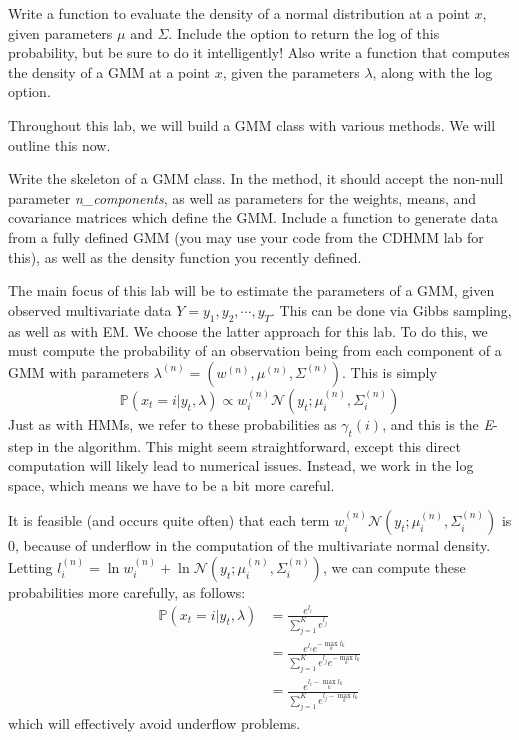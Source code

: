 \begin{problem}
Write a function to evaluate the density of a normal distribution at a point $x$, given parameters $\mu$ and $\Sigma$. Include the option to return the log of this probability, but be sure to do it intelligently! Also write a function that computes the density of a GMM at a point $x$, given the parameters $\lambda$, along with the log option.
\end{problem}

Throughout this lab, we will build a GMM class with various methods. We will outline this now.

\begin{problem}
Write the skeleton of a GMM class. In the  method, it should accept the non-null parameter \emph{n\_components}, as well as parameters for the weights, means, and covariance matrices which define the GMM. Include a function to generate data from a fully defined GMM (you may use your code from the CDHMM lab for this), as well as the density function you recently defined.
\end{problem}

The main focus of this lab will be to estimate the parameters of a GMM, given observed multivariate data $Y = y_{1}, y_{2}, \cdots, y_{T}$. This can be done via Gibbs sampling, as well as with EM. We choose the latter approach for this lab. To do this, we must compute the probability of an observation being from each component of a GMM with parameters $\lambda^{(n)} = \left( w^{(n)}, \mu^{(n)}, \Sigma^{(n)}\right)$. This is simply 
\begin{equation*}
\mathbb{P}(x_{t} = i | y_{t}, \lambda) \propto w_{i}^{(n)} \mathcal{N}(y_{t} ; \mu_{i}^{(n)}, \Sigma_{i}^{(n)})
\end{equation*}
Just as with HMMs, we refer to these probabilities as $\gamma_{t}(i)$, and this is the \emph{E}-step in the algorithm. This might seem straightforward, except this direct computation will likely lead to numerical issues. Instead, we work in the log space, which means we have to be a bit more careful.

It is feasible (and occurs quite often) that each term $w_{i}^{(n)}\mathcal{N}(y_{t} ; \mu_{i}^{(n)}, \Sigma_{i}^{(n)})$ is $0$, because of underflow in the computation of the multivariate normal density. Letting $l_{i}^{(n)} = \ln w_{i}^{(n)} + \ln \mathcal{N}(y_{t} ; \mu_{i}^{(n)}, \Sigma_{i}^{(n)})$, we can compute these probabilities more carefully, as follows:
\begin{align*}
\mathbb{P}(x_{t} = i | y_{t}, \lambda) & = \frac{e^{l_{i}}}{\sum_{j=1}^{K} e^{l_{j}}} \\
& = \frac{e^{l_{i}}e^{-\max_{k} l_{k}}}{\sum_{j=1}^{K} e^{l_{j}}e^{-\max_{k} l_{k}}} \\
& = \frac{e^{l_{i} - \max_{k} l_{k}}}{\sum_{j=1}^{K} e^{l_{j} - \max_{k} l_{k}}}
\end{align*}
which will effectively avoid underflow problems.

